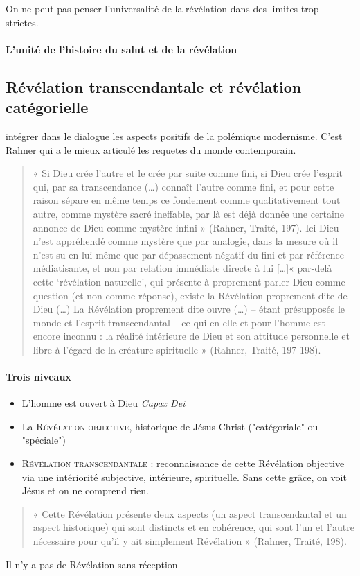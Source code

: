 On ne peut pas penser l'universalité de la révélation dans des limites trop strictes. 
\paragraph{L’unité de l’histoire du salut et de la révélation} 




\subsection{Révélation transcendantale et révélation catégorielle}

intégrer dans le dialogue les aspects positifs de la polémique modernisme. C'est Rahner qui a le mieux articulé les requetes du monde contemporain.

\begin{quote}
    « Si Dieu crée l’autre et le crée par suite comme fini, si Dieu crée l’esprit qui, par sa transcendance (…) connaît l’autre comme fini, et pour cette raison sépare en même temps ce fondement comme qualitativement tout autre, comme mystère sacré ineffable, par là est déjà donnée une certaine annonce de Dieu comme mystère infini » (Rahner, Traité, 197).   Ici Dieu n’est appréhendé comme mystère que par analogie, dans la mesure où il n’est su en lui-même que par dépassement négatif du fini et par référence médiatisante, et non par relation immédiate directe à lui […]« par-delà cette ‘révélation naturelle’, qui présente à proprement parler Dieu comme question (et non comme réponse), existe la Révélation proprement dite de Dieu (…) La Révélation proprement dite ouvre (…) – étant présupposés le monde et l’esprit transcendantal – ce qui en elle et pour l’homme est encore inconnu : la réalité intérieure de Dieu et son attitude personnelle et libre à l’égard de la créature spirituelle » (Rahner, Traité, 197-198).   
\end{quote}

\paragraph{Trois niveaux }
\begin{itemize}
    \item L'homme est ouvert à Dieu \emph{Capax Dei}
    \item La \textsc{Révélation objective}, historique de Jésus Christ ("catégoriale" ou "spéciale")
    \item \textsc{Révélation transcendantale }: reconnaissance de cette Révélation objective via une intériorité subjective, intérieure, spirituelle. Sans cette grâce, on voit Jésus et on ne comprend rien. 
\end{itemize}
\begin{quote}
    « Cette Révélation présente deux aspects (un aspect transcendantal et un aspect historique) qui sont distincts et en cohérence, qui sont l’un et l’autre nécessaire pour qu’il y ait simplement Révélation » (Rahner, Traité, 198). 
\end{quote}
\begin{Synthesis}
Il n'y a pas de Révélation sans réception
\end{Synthesis}


